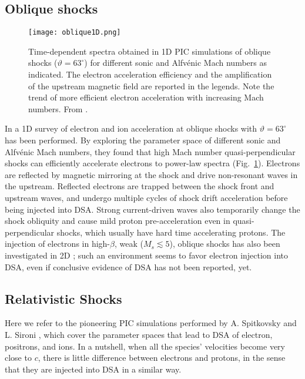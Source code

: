 \documentclass[varenna]{cimento}
\newcommand\thbn{\vartheta}
\renewcommand{\deg}{^{\circ}}
\begin{document}
\subsection{Oblique shocks}
\begin{figure}[t]
\centering
\vspace{-15pt}
\texttt{[image: oblique1D.png]}
\vspace{-3mm}
 \caption{\label{fig:oblique1D}
Time-dependent spectra obtained in 1D PIC simulations of oblique shocks ($\thbn=63\deg$) for different sonic and Alfv\'enic Mach numbers as indicated. The electron acceleration efficiency and the amplification of the upstream magnetic field are reported in the legends.
 Note the trend of more efficient electron acceleration with increasing Mach numbers. From \cite{xu+20}.}
\end{figure}

In \cite{xu+20} a 1D survey of electron and ion acceleration at oblique shocks with $\thbn=63\deg$ has been performed.
By exploring the parameter space of different sonic and Alfv\'enic Mach numbers, they found that high Mach number quasi-perpendicular shocks can efficiently accelerate electrons to power-law spectra (Fig.~\ref{fig:oblique1D}). 
Electrons are reflected by magnetic mirroring at the shock and drive non-resonant waves in the upstream. 
Reflected electrons are trapped between the shock front and upstream waves, and undergo multiple cycles of shock drift acceleration before being injected into DSA. 
Strong current-driven waves also temporarily change the shock obliquity and cause mild proton pre-acceleration even in quasi-perpendicular shocks, which usually have hard time accelerating protons. 
The injection of electrons in high-$\beta$, weak ($M_s\lesssim 5$), oblique shocks has also been investigated in 2D \cite{guo+14a,guo+14b,ha+21,kang+19,ha+22,ha+23}; 
such an environment seems to favor electron injection into DSA, even if conclusive evidence of DSA has not been reported, yet. 

\subsection{Relativistic Shocks}
Here we refer to the pioneering PIC simulations performed by A. Spitkovsky and L. Sironi \cite{spitkovsky08,sironi+09, sironi+11,sironi+13}, which cover the parameter spaces that lead to DSA of electron, positrons, and ions. 
In a nutshell, when all the species' velocities become very close to $c$, there is little difference between electrons and protons, in the sense that they are injected into DSA in a similar way.
\end{document}
